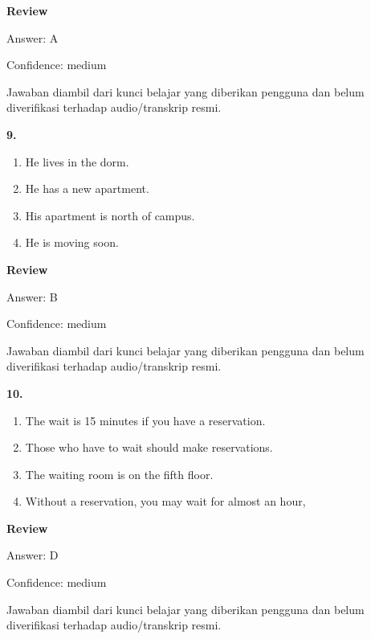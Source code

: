 \documentclass[12pt]{article}
\begin{document}
\par
\begingroup
\setlength{\parskip}{0pt}
\setlength{\parindent}{0pt}
\textbf{Review}\par
Answer: A\par
Confidence: medium\par
Jawaban diambil dari kunci belajar yang diberikan pengguna dan belum diverifikasi terhadap audio/transkrip resmi.\par
\endgroup
\par
\vspace{0.25\baselineskip}
\noindent\textbf{9.}
\begin{enumerate}[label=(\Alph*),leftmargin=*,itemsep=0.2em]
\item He lives in the dorm.
\item He has a new apartment.
\item His apartment is north of campus.
\item He is moving soon.
\end{enumerate}
\par
\begingroup
\setlength{\parskip}{0pt}
\setlength{\parindent}{0pt}
\textbf{Review}\par
Answer: B\par
Confidence: medium\par
Jawaban diambil dari kunci belajar yang diberikan pengguna dan belum diverifikasi terhadap audio/transkrip resmi.\par
\endgroup
\par
\vspace{0.25\baselineskip}
\noindent\textbf{10.}
\begin{enumerate}[label=(\Alph*),leftmargin=*,itemsep=0.2em]
\item The wait is 15 minutes if you have a reservation.
\item Those who have to wait should make reservations.
\item The waiting room is on the fifth floor.
\item Without a reservation, you may wait for almost an hour,
\end{enumerate}
\par
\begingroup
\setlength{\parskip}{0pt}
\setlength{\parindent}{0pt}
\textbf{Review}\par
Answer: D\par
Confidence: medium\par
Jawaban diambil dari kunci belajar yang diberikan pengguna dan belum diverifikasi terhadap audio/transkrip resmi.\par
\end{document}
